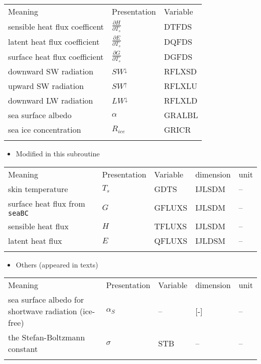 \setlength\LTleft{0pt}\setlength\LTright{0pt}\begin{longtable}[]{@{}lll@{}}
\toprule\relax
Meaning & Presentation & Variable \\ \addlinespace
\midrule\relax
\endhead
sensible heat flux coefficent & \(\frac{\partial H}{\partial T_s}\) &
DTFDS \\ \addlinespace
latent heat flux coefficient & \(\frac{\partial E}{\partial T_s}\) &
DQFDS \\ \addlinespace
surface heat flux coefficient & \(\frac{\partial G}{\partial T_s}\) &
DGFDS \\ \addlinespace
downward SW radiation & \(SW^\downarrow\) & RFLXSD \\ \addlinespace
upward SW radiation & \(SW^\uparrow\) & RFLXLU \\ \addlinespace
downward LW radiation & \(LW^\downarrow\) & RFLXLD \\ \addlinespace
sea surface albedo & \(\alpha\) & GRALBL \\ \addlinespace
sea ice concentration & \(R_{ice}\) & GRICR \\ \addlinespace
\bottomrule
\end{longtable}

\begin{itemize}
\tightlist
\item
  Modified in this subroutine
\end{itemize}

\setlength\LTleft{0pt}\setlength\LTright{0pt}\begin{longtable}[]{@{}lllll@{}}
\toprule\relax
Meaning & Presentation & Variable & dimension & unit \\ \addlinespace
\midrule\relax
\endhead
skin temperature & \(T_s\) & GDTS & IJLSDM & -- \\ \addlinespace
surface heat flux from \texttt{seaBC} & \(G\) & GFLUXS & IJLSDM &
-- \\ \addlinespace
sensible heat flux & \(H\) & TFLUXS & IJLSDM & -- \\ \addlinespace
latent heat flux & \(E\) & QFLUXS & IJLDSM & -- \\ \addlinespace
\bottomrule
\end{longtable}

\begin{itemize}
\tightlist
\item
  Others (appeared in texts)
\end{itemize}

\setlength\LTleft{0pt}\setlength\LTright{0pt}\begin{longtable}[]{@{}lllll@{}}
\toprule\relax
Meaning & Presentation & Variable & dimension & unit \\ \addlinespace
\midrule\relax
\endhead
sea surface albedo for shortwave radiation (ice-free) & \(\alpha_S\) &
-- & {[}-{]} & -- \\ \addlinespace
the Stefan-Boltzmann constant & \(\sigma\) & STB & -- &
-- \\ \addlinespace
\bottomrule
\end{longtable}

